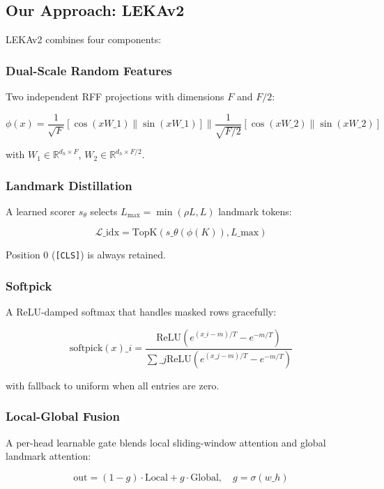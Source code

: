 \subsection{Our Approach: LEKAv2}

LEKAv2 combines four components:

\subsubsection{Dual-Scale Random Features}

Two independent RFF projections with dimensions $F$ and $F/2$:

\[
\phi(x) = \frac{1}{\sqrt{F}} [\cos(x W\_1) \| \sin(x W\_1)] 
\| \frac{1}{\sqrt{F/2}} [\cos(x W\_2) \| \sin(x W\_2)]
\tag{1.2}
\]

with $W_1 \in \mathbb{R}^{d_h \times F}$, $W_2 \in \mathbb{R}^{d_h \times F/2}$.

\subsubsection{Landmark Distillation}

A learned scorer $s_\theta$ selects $L_\text{max} = \min(\rho L, L)$ 
landmark tokens:

\[
\mathcal{L}\_\text{idx} = \text{TopK}(s\_\theta(\phi(K)), L\_\text{max})
\tag{1.3}
\]

Position 0 (\texttt{[CLS]}) is always retained.

\subsubsection{Softpick}

A ReLU-damped softmax that handles masked rows gracefully:

\[
\text{softpick}(x)\_i = \frac{\text{ReLU}(e^{(x\_i - m)/T} - e^{-m/T})}{\sum\_j \text{ReLU}(e^{(x\_j - m)/T} - e^{-m/T})}
\tag{1.4}
\]

with fallback to uniform when all entries are zero.

\subsubsection{Local-Global Fusion}

A per-head learnable gate blends local sliding-window attention and 
global landmark attention:

\[
\text{out} = (1 - g) \cdot \text{Local} + g \cdot \text{Global}, \quad g = \sigma(w\_h)
\tag{1.5}
\]

